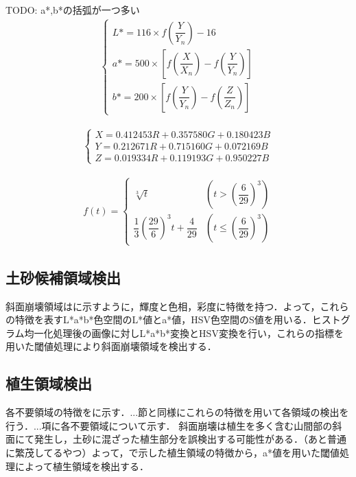       TODO: a*,b*の括弧が一つ多い
      \begin{eqnarray}
      \label{Lab表色系1}
        \left\{
          \begin{array}{l}
            L* = 116 \times f(\dfrac{Y} {Y_{n}}) - 16 \\
            a* = 500 \times [f(\dfrac{X} {X_{n}}) - f(\dfrac{Y} {Y_{n}})] \\
            b* = 200 \times [f(\dfrac{Y} {Y_{n}}) - f(\dfrac{Z} {Z_{n}})]
          \end{array}
        \right.
      \end{eqnarray}

      \begin{eqnarray}
        \label{Lab表色系2}
        \left\{
          \begin{array}{l}
            X = 0.412453R + 0.357580G + 0.180423B \\
            Y = 0.212671R + 0.715160G + 0.072169B \\
            Z = 0.019334R + 0.119193G + 0.950227B
          \end{array}
        \right.
      \end{eqnarray}

      \begin{eqnarray}
        \label{Lab表色系4}
          f(t) = 
          \left\{
            \begin{array}{lll}
              \sqrt[3]{t} 
                &(t >    (\dfrac{6} {29})^3) \\
              \dfrac{1} {3} (\dfrac{29} {6})^3 t + \dfrac{4} {29}
                &(t \leq (\dfrac{6} {29})^3)
            \end{array}
          \right.
      \end{eqnarray}

    \subsection{土砂候補領域検出}
      斜面崩壊領域は\tref{}に示すように，輝度と色相，彩度に特徴を持つ．よって，これらの特徴を表すL*a*b*色空間のL*値とa*値，HSV色空間のS値を用いる．ヒストグラム均一化処理後の画像に対しL*a*b*変換とHSV変換を行い，これらの指標を用いた閾値処理により斜面崩壊領域を検出する．

    \subsection{植生領域検出}
      \label{植生除去}
      各不要領域の特徴を\Fref{}に示す．...節と同様にこれらの特徴を用いて各領域の検出を行う．...項に各不要領域について示す．
      斜面崩壊は植生を多く含む山間部の斜面にて発生し，土砂に混ざった植生部分を誤検出する可能性がある．（あと普通に繁茂してるやつ）よって，\Fref{}で示した植生領域の特徴から，a*値を用いた閾値処理によって植生領域を検出する．

